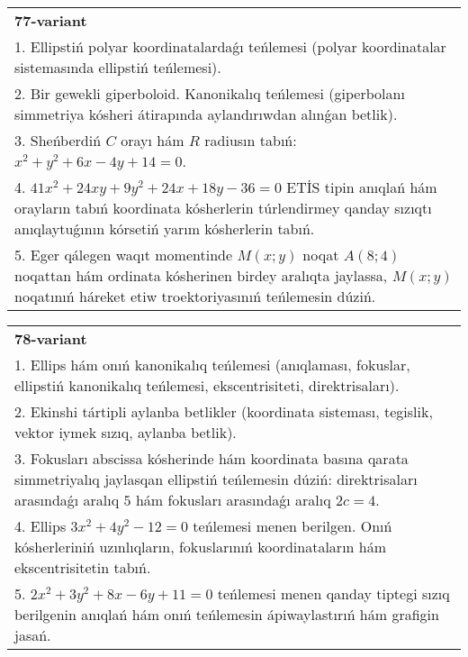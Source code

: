 \documentclass{article}
\begin{document}
\begin{tabular}{m{17cm}}
\textbf{77-variant}\\
1. Ellipstiń polyar koordinatalardaǵı teńlemesi (polyar koordinatalar sistemasında ellipstiń teńlemesi).\\

2. Bir gewekli giperboloid. Kanonikalıq teńlemesi (giperbolanı simmetriya kósheri átirapında aylandırıwdan alınǵan betlik).\\

3. Sheńberdiń $C$ orayı hám $R$ radiusın tabıń: $x^2+y^2+6 x-4 y+14=0$.\\

4. $41x^{2} + 24xy + 9y^{2} + 24x + 18y - 36 = 0$ ETİS tipin anıqlań hám orayların tabıń koordinata kósherlerin túrlendirmey qanday sızıqtı anıqlaytuǵının kórsetiń yarım kósherlerin tabıń.  \\

5. Eger qálegen waqıt momentinde $M(x;y)$ noqat $A(8;4)$ noqattan hám ordinata kósherinen birdey aralıqta jaylassa, $M(x;y)$ noqatınıń háreket etiw troektoriyasınıń teńlemesin dúziń.  
\end{tabular}
\vspace{1cm}


\begin{tabular}{m{17cm}}
\textbf{78-variant}\\
1. Ellips hám onıń kanonikalıq teńlemesi (anıqlaması, fokuslar, ellipstiń kanonikalıq teńlemesi, ekscentrisiteti, direktrisaları).\\

2. Ekinshi tártipli aylanba betlikler (koordinata sisteması, tegislik, vektor iymek sızıq, aylanba betlik).\\

3. Fokusları abscissa kósherinde hám koordinata basına qarata simmetriyalıq jaylasqan ellipstiń teńlemesin dúziń: direktrisaları arasındaǵı aralıq $5$ hám fokusları arasındaǵı aralıq $2 c=4$.\\

4. Ellips $3x^{2} + 4y^{2} - 12 = 0$ teńlemesi menen berilgen. Onıń kósherleriniń uzınlıqların, fokuslarınıń koordinataların hám ekscentrisitetin tabıń.  \\

5. $2x^{2} + 3y^{2} + 8x - 6y + 11 = 0$ teńlemesi menen qanday tiptegi sızıq berilgenin anıqlań hám onıń teńlemesin ápiwaylastırıń hám grafigin jasań.  
\end{tabular}
\vspace{1cm}
\end{document}

